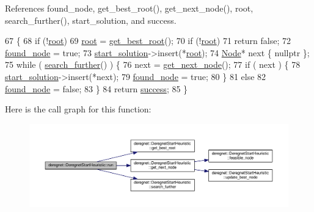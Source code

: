 References found\+\_\+node, get\+\_\+best\+\_\+root(), get\+\_\+next\+\_\+node(), root, search\+\_\+further(), start\+\_\+solution, and success.


\begin{DoxyCode}
67                                  \{
68     \textcolor{keywordflow}{if} (!\hyperlink{classderegnet_1_1DeregnetStartHeuristic_a4605d41352e3adf1f9f9f32466a4e61e}{root})
69         \hyperlink{classderegnet_1_1DeregnetStartHeuristic_a4605d41352e3adf1f9f9f32466a4e61e}{root} = \hyperlink{classderegnet_1_1DeregnetStartHeuristic_a372be86d0fb8ac94bd926a1f4d09e102}{get\_best\_root}();
70     \textcolor{keywordflow}{if} (!\hyperlink{classderegnet_1_1DeregnetStartHeuristic_a4605d41352e3adf1f9f9f32466a4e61e}{root})
71         \textcolor{keywordflow}{return} \textcolor{keyword}{false};
72     \hyperlink{classderegnet_1_1DeregnetStartHeuristic_a1ca705794583fb3b6e563efeceb4445e}{found\_node} = \textcolor{keyword}{true};
73     \hyperlink{classderegnet_1_1DeregnetStartHeuristic_a7450e11ca0a265b055f95e7832b65e2f}{start\_solution}->insert(*\hyperlink{classderegnet_1_1DeregnetStartHeuristic_a4605d41352e3adf1f9f9f32466a4e61e}{root});
74     \hyperlink{namespacederegnet_a744bad34f2de9856d36715a445f027f3}{Node}* next \{ \textcolor{keyword}{nullptr} \};
75     \textcolor{keywordflow}{while} ( \hyperlink{classderegnet_1_1DeregnetStartHeuristic_ac3ee2c3022512f9d4ec7a6b49358e60a}{search\_further}() ) \{
76         next = \hyperlink{classderegnet_1_1DeregnetStartHeuristic_a6ec478444151e54625951f858ff76761}{get\_next\_node}();
77         \textcolor{keywordflow}{if} ( next ) \{
78             \hyperlink{classderegnet_1_1DeregnetStartHeuristic_a7450e11ca0a265b055f95e7832b65e2f}{start\_solution}->insert(*next);
79             \hyperlink{classderegnet_1_1DeregnetStartHeuristic_a1ca705794583fb3b6e563efeceb4445e}{found\_node} = \textcolor{keyword}{true};
80         \}
81         \textcolor{keywordflow}{else}
82             \hyperlink{classderegnet_1_1DeregnetStartHeuristic_a1ca705794583fb3b6e563efeceb4445e}{found\_node} = \textcolor{keyword}{false};
83     \}
84     \textcolor{keywordflow}{return} \hyperlink{classderegnet_1_1DeregnetStartHeuristic_a72fd16ee027f6aa973f1ff29746addba}{success};
85 \}
\end{DoxyCode}


Here is the call graph for this function\+:\nopagebreak
\begin{figure}[H]
\begin{center}
\leavevmode
\includegraphics[width=350pt]{classderegnet_1_1DeregnetStartHeuristic_aa2afcafa3d3838a7e7b05faf586954e8_cgraph}
\end{center}
\end{figure}


